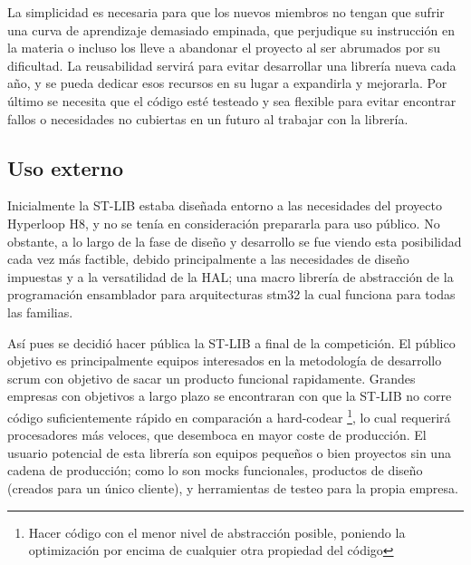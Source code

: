 \documentclass{report}
\begin{document}
La {simplicidad} es necesaria para que los nuevos miembros no tengan que sufrir una curva de aprendizaje demasiado empinada, que perjudique su instrucción en la materia o incluso los lleve a abandonar el proyecto al ser abrumados por su dificultad. La {reusabilidad} servirá para evitar desarrollar una librería nueva cada año, y se pueda dedicar esos recursos en su lugar a expandirla y mejorarla. Por último se necesita que el código esté {testeado} y sea {flexible} para evitar encontrar fallos o necesidades no cubiertas en un futuro al trabajar con la librería. 

\subsection{Uso externo}
Inicialmente la ST-LIB estaba diseñada entorno a las necesidades del proyecto Hyperloop H8, y no se tenía en consideración prepararla para uso público. No obstante, a lo largo de la fase de diseño y desarrollo se fue viendo esta posibilidad cada vez más factible, debido principalmente a las necesidades de diseño impuestas y a la versatilidad de la HAL; una macro librería de abstracción de la programación ensamblador para arquitecturas stm32 la cual funciona para todas las familias. \par

Así pues se decidió hacer pública la ST-LIB a final de la competición. El público objetivo es principalmente equipos interesados en la metodología de desarrollo scrum con objetivo de sacar un producto funcional rapidamente. Grandes empresas con objetivos a largo plazo se encontraran con que la ST-LIB no corre código suficientemente rápido en comparación a hard-codear \footnote{Hacer código con el menor nivel de abstracción posible, poniendo la optimización por encima de cualquier otra propiedad del código}, lo cual requerirá procesadores más veloces, que desemboca en mayor coste de producción. El usuario potencial de esta librería son equipos pequeños o bien proyectos sin una cadena de producción; como lo son mocks funcionales, productos de diseño (creados para un único cliente), y herramientas de testeo para la propia empresa. 
\end{document}
